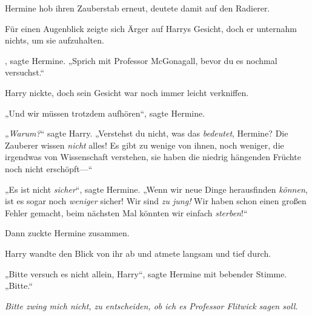 Hermine hob ihren Zauberstab erneut, deutete damit auf den Radierer.

Für einen Augenblick zeigte sich Ärger auf Harrys Gesicht, doch er unternahm nichts, um sie aufzuhalten.

, sagte Hermine. „Sprich mit Professor McGonagall, bevor du es nochmal versuchst.“

Harry nickte, doch sein Gesicht war noch immer leicht verkniffen.

„Und wir müssen trotzdem aufhören“, sagte Hermine.

„\emph{Warum?}“ sagte Harry. „Verstehst du nicht, was das \emph{bedeutet}, Hermine? Die Zauberer wissen \emph{nicht} alles! Es gibt zu wenige von ihnen, noch weniger, die irgendwas von Wissenschaft verstehen, sie haben die niedrig hängenden Früchte noch nicht erschöpft—“

„Es ist nicht \emph{sicher}“, sagte Hermine. „Wenn wir neue Dinge herausfinden \emph{können}, ist es sogar noch \emph{weniger} sicher! Wir sind \emph{zu jung!} Wir haben schon einen großen Fehler gemacht, beim nächsten Mal könnten wir einfach \emph{sterben}!“

Dann zuckte Hermine zusammen.

Harry wandte den Blick von ihr ab und atmete langsam und tief durch.

„Bitte versuch es nicht allein, Harry“, sagte Hermine mit bebender Stimme. „Bitte.“

\emph{Bitte zwing mich nicht, zu entscheiden, ob ich es Professor Flitwick sagen soll.}

